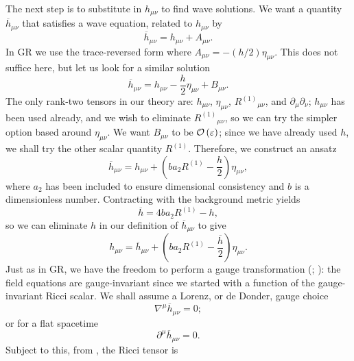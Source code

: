 The next step is to substitute in $h_{\mu\nu}$ to find wave solutions. We want a quantity $\overline{h}_{\mu\nu}$ that satisfies a wave equation, related to $h_{\mu\nu}$ by
\begin{equation}
\overline{h}_{\mu\nu} = h_{\mu\nu} + A_{\mu\nu}.
\end{equation}
In GR we use the trace-reversed form where $A_{\mu\nu} = -(h/2)\eta_{\mu\nu}$. This does not suffice here, but let us look for a similar solution
\begin{equation}
\overline{h}_{\mu\nu} = h_{\mu\nu} - \dfrac{h}{2}\eta_{\mu\nu} + B_{\mu\nu}.
\end{equation}
The only rank-two tensors in our theory are: $h_{\mu\nu}$, $\eta_{\mu\nu}$, ${R^{(1)}}_{\mu\nu}$, and $\partial_\mu\partial_\nu$; $h_{\mu\nu}$ has been used already, and we wish to eliminate ${R^{(1)}}_{\mu\nu}$, so we can try the simpler option based around $\eta_{\mu\nu}$. We want $B_{\mu\nu}$ to be $\mathcal{O}\left({\varepsilon}\right)$; since we have already used $h$, we shall try the other scalar quantity $R^{(1)}$. Therefore, we construct an ansatz
\begin{equation}
\overline{h}_{\mu\nu} = h_{\mu\nu} + \left(b a_2 R^{(1)} - \dfrac{h}{2}\right)\eta_{\mu\nu},
\label{eq:Ansatz}
\end{equation}
where $a_2$ has been included to ensure dimensional consistency and $b$ is a dimensionless number. Contracting with the background metric yields
\begin{equation}
\overline{h} = 4b a_2 R^{(1)} - h,
\label{eq:h_trace}
\end{equation}
so we can eliminate $h$ in our definition of $\overline{h}_{\mu\nu}$ to give
\begin{equation}
h_{\mu\nu} = \overline{h}_{\mu\nu} + \left(b a_2 R^{(1)} -\dfrac{\overline{h}}{2}\right)\eta_{\mu\nu}.
\end{equation}
Just as in GR, we have the freedom to perform a gauge transformation (\citealt[box 18.2]{Misner1973}; \citealt[section 17.1]{Hobson2006}): the field equations are gauge-invariant since we started with a function of the gauge-invariant Ricci scalar. We shall assume a Lorenz, or de Donder, gauge choice
\begin{equation}
\nabla^\mu \overline{h}_{\mu\nu} = 0;
\end{equation}
or for a flat spacetime
\begin{equation}
\partial^\mu \overline{h}_{\mu\nu} = 0.
\label{eq:Lorenz}
\end{equation}
Subject to this, from , the Ricci tensor is
